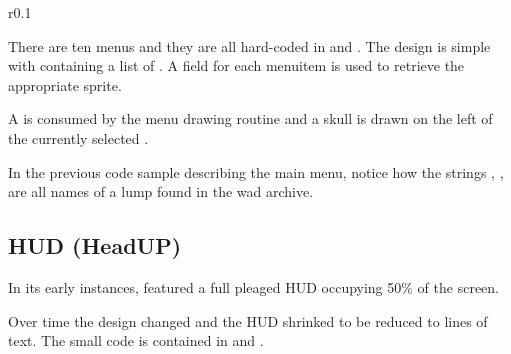 \begin{wrapfigure}[5]{r}{0.1\textwidth}
\centering
{}
\end{wrapfigure}
There are ten menus and they are all hard-coded in  and . The design is simple with  containing a list of . A  field for each menuitem is used to retrieve the appropriate sprite.\\
\par
A  is consumed by the menu drawing routine and a skull is drawn on the left of the currently selected .\\
\par
{}
\par
\begin{minipage}{0.65\textwidth}
\end{minipage}
\begin{minipage}{0.35\textwidth}
\centering
{}
\end{minipage}
\par
{}
\par
In the previous code sample describing the main menu, notice how the strings , ,  are all names of a lump found in the wad archive.\\
\par








\subsection{HUD (HeadUP)}
In its early instances, \doom featured a full pleaged HUD occupying 50\% of the screen.\\
\par
{}
\par
Over time the design changed and the HUD shrinked to be reduced to lines of text. The small code is contained in  and .\\
\par
{}\\
\par








